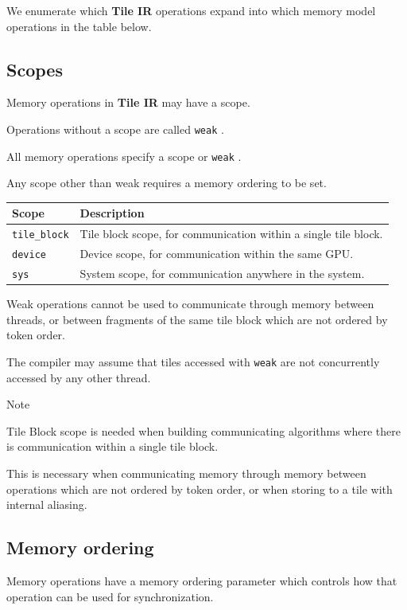 \documentclass{article}
\begin{document}
We enumerate which \textbf{Tile IR} operations expand into which memory model operations in the table below.



\subsection{Scopes}

Memory operations in \textbf{Tile IR} may have a scope.

Operations without a scope are called \texttt{weak} .

All memory operations specify a scope or \texttt{weak} .

Any scope other than weak requires a memory ordering to be set.


\begin{longtable}{l|l}
\hline
Scope & Description \\ \hline
\texttt{tile\_block} & Tile block scope, for communication within a single tile block. \\ \hline
\texttt{device} & Device scope, for communication within the same GPU. \\ \hline
\texttt{sys} & System scope, for communication anywhere in the system. \\ \hline
\end{longtable}

Weak operations cannot be used to communicate through memory between threads, or between fragments of the same tile block which are not ordered by token order.

The compiler may assume that tiles accessed with \texttt{weak} are not concurrently accessed by any other thread.


Note


Tile Block scope is needed when building communicating algorithms where there is communication within a single tile block.

This is necessary when communicating memory through memory between operations which are not ordered by token order, or when storing to a tile with internal aliasing.



\subsection{Memory ordering}

Memory operations have a memory ordering parameter which controls how that operation can be used for synchronization.
\end{document}
